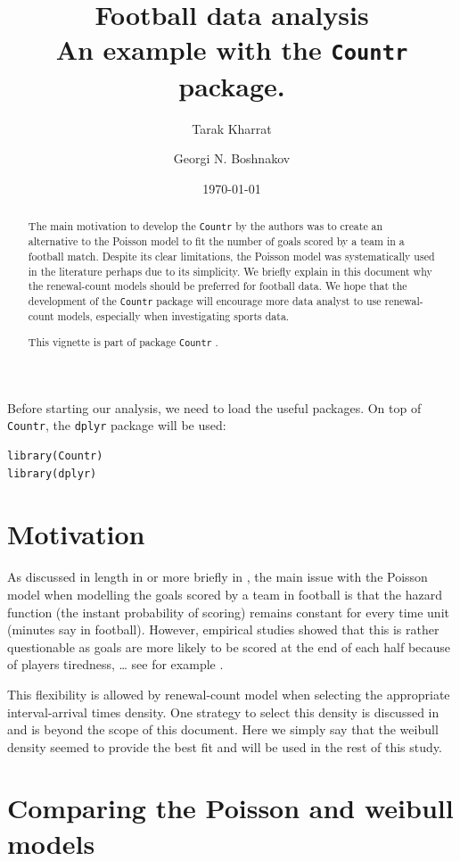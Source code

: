 \documentclass[a4paper,twoside,11pt]{article}
\author[1]{Tarak Kharrat}
\author[2]{Georgi N. Boshnakov}
\affil[1]{Salford Business School, University of Salford, UK.}
\affil[2]{School of Mathematics, University of Manchester, UK.}
\date{\today}
\title{Football data analysis\\\medskip
\large An example with the \texttt{Countr} package.}
\begin{document}
\maketitle
\begin{abstract}
The main motivation to develop the \texttt{Countr} by the authors was to create an
alternative to the Poisson model to fit the number of goals scored by a team in
a football match. Despite its clear limitations, the Poisson model was
systematically used in the literature perhaps due to its simplicity. We briefly
explain in this document why the renewal-count models should be preferred for
football data. We hope that the development of the \texttt{Countr} package will
encourage more data analyst to use renewal-count models, especially when
investigating sports data.

This vignette is part of package \texttt{Countr} \citep[see][]{CountrJssArticle}.
\end{abstract}

Before starting our analysis, we need to load the useful packages. On top of
\texttt{Countr}, the \texttt{dplyr} package \citep{dplyr2016} will be used:
\begin{verbatim}
library(Countr)
library(dplyr)
\end{verbatim}

\section{Motivation}
\label{sec:orgda29206}

As discussed in length in \citet[Chapter 4]{TarakPhd} or more briefly in
\citet{boshnakov2017bivariate}, the main issue with the Poisson model when
modelling the goals scored by a team in football is that the hazard function
(the instant probability of scoring) remains constant for every time unit
(minutes say in football). However, empirical studies showed that this is rather
questionable as goals are more likely to be scored at the end of each half
because of players tiredness, \ldots{} see for example
\citet[Figure~1]{dixon1998birth}. 

This flexibility is allowed by renewal-count model when selecting  the
appropriate interval-arrival times density. One strategy to select this density
is discussed in \citet[Chapter 4]{TarakPhd} and is beyond the scope of this
document. Here we simply say that the weibull density seemed to provide the best
fit and will be used in the rest of this study.

\section{Comparing the Poisson and weibull models}
\label{sec:org3832b1d}
\end{document}

